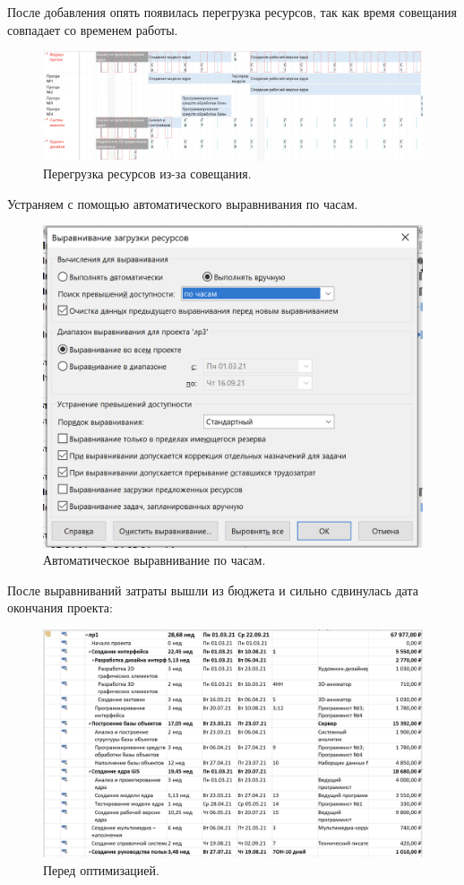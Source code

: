 \documentclass[a4paper,14pt]{extreport} %
\begin{document}
\begin{enumerate}
После добавления опять появилась перегрузка ресурсов, так как время совещания совпадает со временем работы.

\begin{figure}[H]
  \centering
  \caption{Перегрузка ресурсов из-за совещания. }
  \includegraphics[scale=0.4]{5}
\end{figure}

Устраняем с помощью автоматического выравнивания по часам.

\begin{figure}[H]
  \centering
  \caption{Автоматическое выравнивание по часам. }
  \includegraphics[scale=0.8]{6}
\end{figure}

После выравниваний затраты вышли из бюджета и сильно сдвинулась дата окончания проекта:

\begin{figure}[H]
  \centering
  \caption{Перед  оптимизацией. }
  \includegraphics[scale=0.5]{7}
\end{figure}


\end{enumerate}
\end{document}
